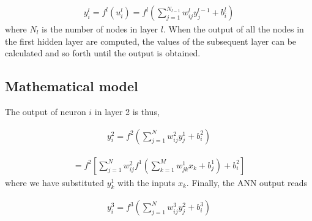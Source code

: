 \documentclass[letterpaper,10pt,english]{sphinxmanual}
\begin{document}
\begin{equation*}
\begin{split}
\begin{equation}
 y_i^l = f^l(u_i^l) = f^l\left(\sum_{j=1}^{N_{l-1}} w_{ij}^l y_j^{l-1} + b_i^l\right)
\label{generalLayer} \tag{4}
\end{equation}
\end{split}
\end{equation*}
where \(N_l\) is the number of nodes in layer \(l\). When the output of
all the nodes in the first hidden layer are computed, the values of
the subsequent layer can be calculated and so forth until the output
is obtained.


\subsection{Mathematical model}
\label{\detokenize{chapter6:id2}}
The output of neuron \(i\) in layer 2 is thus,




\begin{equation*}
\begin{split}
\begin{equation}
 y_i^2 = f^2\left(\sum_{j=1}^N w_{ij}^2 y_j^1 + b_i^2\right) 
\label{_auto2} \tag{5}
\end{equation}
\end{split}
\end{equation*}



\begin{equation*}
\begin{split}
\begin{equation} 
 = f^2\left[\sum_{j=1}^N w_{ij}^2f^1\left(\sum_{k=1}^M w_{jk}^1 x_k + b_j^1\right) + b_i^2\right]
\label{outputLayer2} \tag{6}
\end{equation}
\end{split}
\end{equation*}
where we have substituted \(y_k^1\) with the inputs \(x_k\). Finally, the ANN output reads




\begin{equation*}
\begin{split}
\begin{equation}
 y_i^3 = f^3\left(\sum_{j=1}^N w_{ij}^3 y_j^2 + b_i^3\right) 
\label{_auto3} \tag{7}
\end{equation}
\end{split}
\end{equation*}
\end{document}
